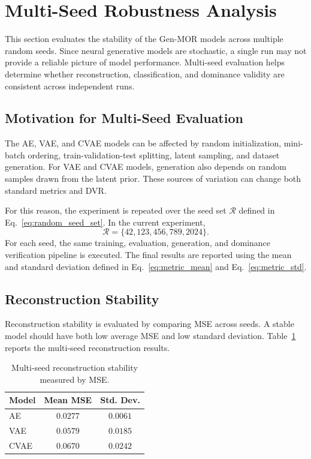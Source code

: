 \section{Multi-Seed Robustness Analysis}
\label{sec:multi_seed_robustness}

This section evaluates the stability of the Gen-MOR models across multiple random seeds. Since neural generative models are stochastic, a single run may not provide a reliable picture of model performance. Multi-seed evaluation helps determine whether reconstruction, classification, and dominance validity are consistent across independent runs.

\subsection{Motivation for Multi-Seed Evaluation}
\label{subsec:motivation_multiseed}

The AE, VAE, and CVAE models can be affected by random initialization, mini-batch ordering, train-validation-test splitting, latent sampling, and dataset generation. For VAE and CVAE models, generation also depends on random samples drawn from the latent prior. These sources of variation can change both standard metrics and DVR.

For this reason, the experiment is repeated over the seed set $\mathcal{R}$ defined in Eq.~\eqref{eq:random_seed_set}. In the current experiment,
\begin{equation}
    \mathcal{R} = \{42, 123, 456, 789, 2024\}.
    \label{eq:actual_multiseed_set}
\end{equation}
For each seed, the same training, evaluation, generation, and dominance verification pipeline is executed. The final results are reported using the mean and standard deviation defined in Eq.~\eqref{eq:metric_mean} and Eq.~\eqref{eq:metric_std}.

\subsection{Reconstruction Stability}
\label{subsec:reconstruction_stability}

Reconstruction stability is evaluated by comparing MSE across seeds. A stable model should have both low average MSE and low standard deviation. Table~\ref{tab:mse_multiseed} reports the multi-seed reconstruction results.

\begin{table}[H]
\centering
\caption{Multi-seed reconstruction stability measured by MSE.}
\label{tab:mse_multiseed}
\begin{tabular}{|l|c|c|}
\hline
\textbf{Model} & \textbf{Mean MSE} & \textbf{Std. Dev.} \\
\hline
AE & $0.0277$ & $0.0061$ \\
VAE & $0.0579$ & $0.0185$ \\
CVAE & $0.0670$ & $0.0242$ \\
\hline
\end{tabular}
\end{table}

